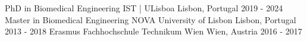 

\begin{cvhonors}
  \cvhonor
    {\;PhD in Biomedical Engineering} %
    {IST | ULisboa} %
    {Lisbon, Portugal} %
    {2019 - 2024} %
    \cvhonor
    {\;Master in Biomedical Engineering} %
    {NOVA University of Lisbon} %
    {Lisbon, Portugal} %
    {2013 - 2018} %
  \cvhonor
    {\;Erasmus} %
    {Fachhochschule Technikum Wien} %
    {Wien, Austria} %
    {2016 - 2017} %

\end{cvhonors}
